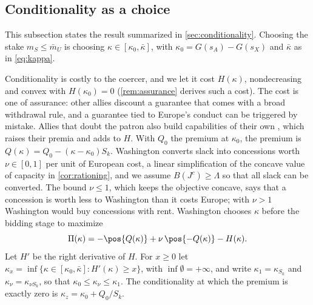 \subsection{Conditionality as a choice}\label{app:conditionality}

This subsection states the result summarized in \cref{sec:conditionality}. Choosing the stake $m_S\le\bar m_U$ is choosing $\kappa\in[\kappa_0,\bar\kappa]$, with $\kappa_0=G(s_A)-G(s_X)$ and $\bar\kappa$ as in \cref{eq:kappa}.

Conditionality is costly to the coercer, and we let it cost $H(\kappa)$, nondecreasing and convex with $H(\kappa_0)=0$ (\cref{rem:assurance} derives such a cost). The cost is one of assurance: other allies discount a guarantee that comes with a broad withdrawal rule, and a guarantee tied to Europe's conduct can be triggered by mistake. Allies that doubt the patron also build capabilities of their own \citep{lanoszka2018atomic}, which raises their premia and adds to $H$. With $Q_0$ the premium at $\kappa_0$, the premium is $Q(\kappa)=Q_0-(\kappa-\kappa_0)S_k$. Washington converts slack into concessions worth $\nu\in[0,1]$ per unit of European cost, a linear simplification of the concave value of capacity in \cref{cor:rationing}, and we assume $B(J^c)\ge\Lambda$ so that all slack can be converted. The bound $\nu\le 1$, which keeps the objective concave, says that a concession is worth less to Washington than it costs Europe; with $\nu>1$ Washington would buy concessions with rent. Washington chooses $\kappa$ before the bidding stage to maximize
\[
\Pi(\kappa)=-\pos{Q(\kappa)}+\nu\,\pos{-Q(\kappa)}-H(\kappa).
\]
Let $H'$ be the right derivative of $H$. For $x\ge 0$ let $\kappa_x=\inf\{\kappa\in[\kappa_0,\bar\kappa]:H'(\kappa)\ge x\}$, with $\inf\emptyset=+\infty$, and write $\kappa_1=\kappa_{S_k}$ and $\kappa_\nu=\kappa_{\nu S_k}$, so that $\kappa_0\le\kappa_\nu\le\kappa_1$. The conditionality at which the premium is exactly zero is $\kappa_z=\kappa_0+Q_0/S_k$.

